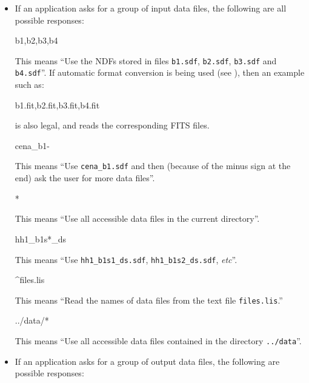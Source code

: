 \documentclass[twoside,11pt]{starlink}
\begin{document}
\begin{itemize}
\item If an application asks for a group of input data files, the following
are all possible responses:

\begin{terminalv}
b1,b2,b3,b4
\end{terminalv}
\vspace{-3mm}

This means ``Use the NDFs stored in files \verb+b1.sdf+, \verb+b2.sdf+,
\verb+b3.sdf+ and \verb+b4.sdf+''. If automatic format conversion is being
used (see ), then an example such
as:

\begin{terminalv}
b1.fit,b2.fit,b3.fit,b4.fit
\end{terminalv}

is also legal, and reads the corresponding FITS files.

\begin{terminalv}
cena_b1-
\end{terminalv}
\vspace{-3mm}

This means ``Use \verb+cena_b1.sdf+ and then (because of the minus sign
at the end) ask the user for more data files''.

\begin{terminalv}
*
\end{terminalv}
\vspace{-3mm}
This means ``Use all accessible data files in the current directory''.

\begin{terminalv}
hh1_b1s*_ds
\end{terminalv}
\vspace{-3mm}
This means ``Use \verb+hh1_b1s1_ds.sdf+, \verb+hh1_b1s2_ds.sdf+, \emph{etc}''.

\begin{terminalv}
^files.lis
\end{terminalv}
\vspace{-3mm}
This means ``Read the names of data files from the text file
\verb+files.lis+.''

\begin{terminalv}
../data/*
\end{terminalv}
\vspace{-3mm}
This means ``Use all accessible data files contained in the directory
\verb+../data+''.

\item If an application asks for a group of output data files, the following
are possible responses:


\end{itemize}
\end{document}
